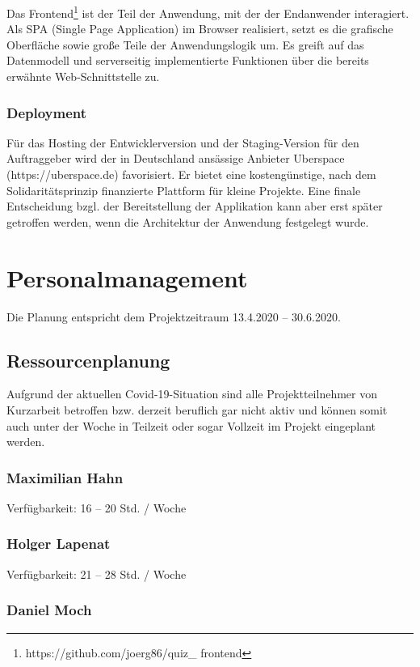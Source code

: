 \documentclass[a4paper,11pt,listof=numbered,glossary=totoc,parskip=half,toc=bib]{scrreprt}
\begin{document}
Das Frontend\footnote{https://github.com/joerg86/quiz\_ frontend} ist der Teil der Anwendung, mit der der Endanwender interagiert. Als SPA (Single Page Application) im Browser realisiert, setzt es die grafische Oberfläche sowie große Teile der Anwendungslogik um.
Es greift auf das Datenmodell und serverseitig implementierte Funktionen über die bereits erwähnte Web-Schnittstelle zu.

\subsection{Deployment}

Für das Hosting der Entwicklerversion und der Staging-Version für den Auftraggeber wird der in Deutschland ansässige Anbieter Uberspace (https://uberspace.de) favorisiert.
Er bietet eine kostengünstige, nach dem Solidaritätsprinzip finanzierte Plattform für kleine Projekte.
Eine finale Entscheidung bzgl. der Bereitstellung der Applikation kann aber erst später getroffen werden, wenn die Architektur der Anwendung festgelegt wurde.
	\newpage
	\chapter{Personalmanagement}

Die Planung entspricht dem Projektzeitraum 13.4.2020 -- 30.6.2020.

\section{Ressourcenplanung}
Aufgrund der aktuellen Covid-19-Situation sind alle Projektteilnehmer von Kurzarbeit betroffen bzw. derzeit beruflich gar nicht aktiv und können somit auch unter der Woche in Teilzeit oder sogar Vollzeit im Projekt eingeplant werden.

\subsection{Maximilian Hahn}

Verfügbarkeit: 16 -- 20 Std. / Woche

\subsection{Holger Lapenat}

Verfügbarkeit: 21 -- 28 Std. / Woche

\subsection{Daniel Moch}
\end{document}

